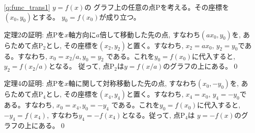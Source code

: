 
\ref{q:func_trans1}  $y=f(x)$の
グラフ上の任意の点Pを考える。その座標を$(x_0, y_0)$とする。
$y_0=f(x_0)$が成り立つ。

定理2の証明: 点Pを$x$軸方向に$a$倍して移動した先の点,
すなわち$(ax_0, y_0)$を, あらためて点P$_2$とし, 
その座標を$(x_2, y_2)$と置く。すなわち, 
$x_2=ax_0,\, y_2=y_0$である。すなわち, $x_0=x_2/a, y_0=y_2$
である。これを$y_0=f(x_0)$に代入すると, $y_2=f(x_2/a)$となる。
従って, 点P$_2$は$y=f(x/a)$のグラフの上にある。\qed



定理4の証明: 点Pを$x$軸に関して対称移動した先の点, 
すなわち$(x_0, -y_0)$を, あらためて点P$_4$とし, 
その座標を$(x_4, y_4)$と置く。すなわち, 
$x_4=x_0,\, y_4=-y_0$である。すなわち, $x_0=x_4, y_0=-y_4$
である。これを$y_0=f(x_0)$に代入すると, $-y_4=f(x_4)$, 
すなわち$y_4=-f(x_4)$となる。従って, 点P$_4$は
$y=-f(x)$のグラフの上にある。\qed
\mv

